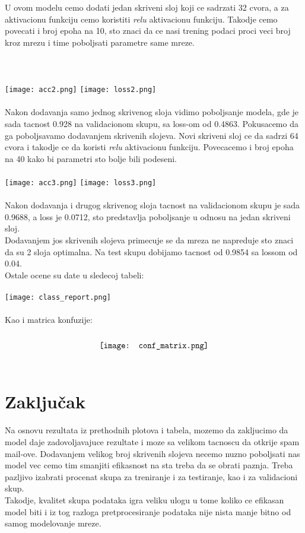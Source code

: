 \documentclass{article}
\begin{document}
U ovom modelu cemo dodati jedan skriveni sloj koji ce sadrzati 32 cvora, a za aktivacionu funkciju cemo koristiti \textit{relu} aktivacionu funkciju. Takodje cemo povecati i broj epoha na 10, sto znaci da ce nasi trening podaci proci veci broj kroz mrezu i time poboljsati parametre same mreze.\\ \\ \\ \\
\texttt{[image: acc2.png]}
\texttt{[image: loss2.png]}\\
\\
Nakon dodavanja samo jednog skrivenog sloja vidimo poboljsanje modela, gde je sada tacnost 0.928 na validacionom skupu, sa loss-om od 0.4863.
Pokusacemo da ga poboljsavamo dodavanjem skrivenih slojeva. Novi skriveni sloj ce da sadrzi 64 cvora i takodje ce da koristi \textit{relu} aktivacionu funkciju. Povecacemo i broj epoha na 40 kako bi parametri sto bolje bili podeseni.\\
\\
\texttt{[image: acc3.png]}
\texttt{[image: loss3.png]}\\
\\
Nakon dodavanja i drugog skrivenog sloja tacnost na validacionom skupu je sada 0.9688, a loss je 0.0712, sto predstavlja poboljsanje u odnosu na jedan skriveni sloj.\\
Dodavanjem jos skrivenih slojeva primecuje se da mreza ne napreduje sto znaci da su 2 sloja optimalna. Na test skupu dobijamo tacnost od 0.9854 sa lossom od 0.04.\\
Ostale ocene su date u sledecoj tabeli:\\ 
\\
\texttt{[image: class\_report.png]}\\
\\
Kao i matrica konfuzije:\\ 
\\
$$\texttt{[image: conf\_matrix.png]}\\$$
\\
\section{Zaključak}
Na osnovu rezultata iz prethodnih plotova i tabela, mozemo da zakljucimo da model daje zadovoljavajuce rezultate i moze sa velikom tacnoscu da otkrije spam mail-ove. Dodavanjem velikog broj skrivenih slojeva necemo nuzno poboljsati nas model vec cemo tim smanjiti efikasnost na sta treba da se obrati paznja. Treba pazljivo izabrati procenat skupa za treniranje i za testiranje, kao i za validacioni skup.\\ 
Takodje, kvalitet skupa podataka igra veliku ulogu u tome koliko ce efikasan model biti i iz tog razloga pretprocesiranje podataka nije nista manje bitno od samog modelovanje mreze. 


\newpage
{}
\begin{thebibliography}{9}

\end{thebibliography}
\end{document}
